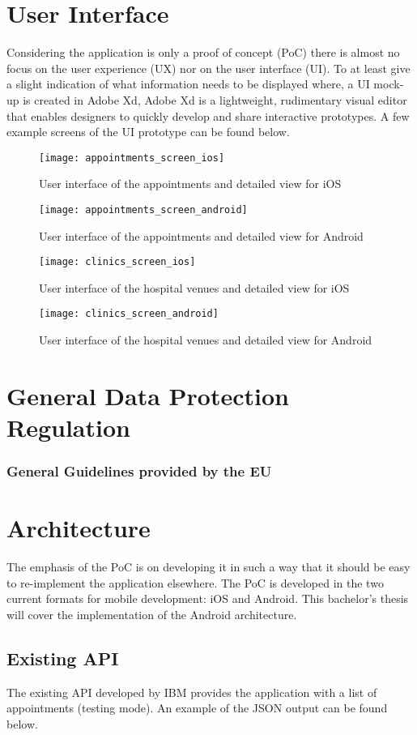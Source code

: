 \section{User Interface}
Considering the application is only a proof of concept (PoC) there is almost no focus on the user experience (UX) nor on the user interface (UI). To at least give a slight indication of what information needs to be displayed where, a UI mock-up is created in Adobe Xd, Adobe Xd is a lightweight, rudimentary visual editor that enables designers to quickly develop and share interactive prototypes. A few example screens of the UI prototype can be found below.
\begin{figure}[H]
\centering
\texttt{[image: appointments\_screen\_ios]}
\caption{User interface of the appointments and detailed view for iOS}
\end{figure}
\begin{figure}[H]
\centering
\texttt{[image: appointments\_screen\_android]}
\caption{User interface of the appointments and detailed view for Android}
\end{figure}
\begin{figure}[H]
\centering
\texttt{[image: clinics\_screen\_ios]}
\caption{User interface of the hospital venues and detailed view for iOS}
\end{figure}
\begin{figure}[H]
\centering
\texttt{[image: clinics\_screen\_android]}
\caption{User interface of the hospital venues and detailed view for Android}
\end{figure}
\section{General Data Protection Regulation}
\subsubsection{General Guidelines provided by the EU}
\section{Architecture}
The emphasis of the PoC is on developing it in such a way that it should be easy to re-implement the application elsewhere. The PoC is developed in the two current formats for mobile development: iOS and Android. This bachelor's thesis will cover the implementation of the Android architecture.
\subsection{Existing API}
The existing API developed by IBM provides the application with a list of appointments (testing mode). An example of the JSON output can be found below.
